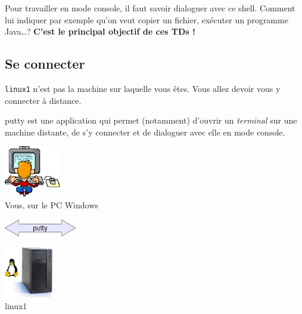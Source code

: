\documentclass[a4paper,11pt]{style-esi/td}
\begin{document}
		Pour travailler en mode console, il faut savoir dialoguer avec ce shell. 
		Comment lui indiquer par exemple qu'on veut copier un fichier, 
		exécuter un programme Java\dots ? 
		\textbf{C'est le principal objectif de ces TDs !}

\newpage
	\subsection{Se connecter}

		\verb_linux1_ n'est pas la machine sur laquelle vous êtes.
		Vous allez devoir vous y connecter à distance.

		\begin{theorie}{putty}
			\textbf{} est une application qui permet (notamment)
			d'ouvrir un \emph{terminal} sur une machine distante, 
			de s'y connecter et de dialoguer avec elle en mode console.
		\end{theorie}

		\begin{colxbox}[colback=white,halign=center,drop fuzzy shadow]
		\begin{centering}
			\begin{minipage}{10em}
				\centering
				\includegraphics[height=6em]{images/putty1}\\
				{\footnotesize Vous, sur le PC Windows}
			\end{minipage}
			\qquad
			\begin{minipage}{8em}
				\centering
				\includegraphics[height=2em]{images/putty2}
			\end{minipage}
			\qquad
			\begin{minipage}{10em}
				\centering
				\includegraphics[height=6em]{images/putty3}\\
				{\footnotesize linux1}
			\end{minipage}
		\end{centering}
		\end{colxbox}
\end{document}
